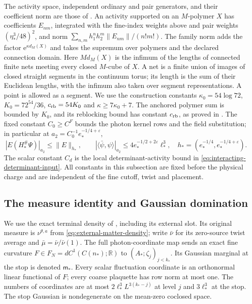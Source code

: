 \documentclass[11pt,letterpaper,reqno]{amsart}
\newcommand{\R}{\mathbb R}
\begin{document}
The activity space, independent ordinary and pair generators, and
their coefficient norm are those of \cite[\S2.2]{NormalizedContraction}.
An activity supported on an $M$-polymer $X$ has coefficients
$E_{nm}$, integrated with the fine-index weights above and pair
weights $(\eta_*^3/48)^2$, and norm
$\sum_{n,m}h_1^nh_2^m\|E_{nm}\|/(n!m!)$.
The family norm adds the factor $\mathrm e^{\kappa d_M(X)}$ and takes
the supremum over polymers and the declared connection domain.
Here $Md_M(X)$ is the infimum of the lengths of connected finite
nets meeting every closed $M$-cube of $X$. A net is a finite union
of images of closed straight segments in the continuum torus;
its length is the sum of their Euclidean lengths, with the infimum
also taken over segment representations. A point is allowed as a
segment. We use the construction constants
$\kappa_0=54\log72$, $K_0=72^{54}/36$,
$c_{\rm rb}=54K_0$ and $\kappa\ge7\kappa_0+7$.
The anchored polymer sum is bounded by $K_0$, and its reblocking
bound has constant $c_{\rm rb}$, as proved in
\cite[Appendix~B, (79)--(83)]{NormalizedContraction}.
The fixed constant $C_0\ge C^F$ bounds the photon kernel rows and
the field substitution; in particular at
$a_2=C_0^{-1}e_*^{-1/4+\varepsilon}$,
\[
 |E(H_*^\#\Psi)|_{a_2}\le\|E\|_{h_*},\qquad
 |\langle\bar\psi,\psi\rangle|_{a_2}
          \le4e_*^{-1/2+2\varepsilon}\ell_*^3,
 \quad h_*=(e_*^{-1/4},e_*^{-1/4+\varepsilon}).
\]
The scalar constant $C_d$ is the local determinant-activity bound
in \eqref{eq:interacting-determinant-input}.
All constants in this subsection are fixed before the physical charge
and are independent of the fine cutoff, twist and placement.

\subsection{The measure identity and Gaussian domination}
We use the exact terminal density of
\cite[Theorem~B]{TerminalPressure}, including its external slot.
Its original measure is $\nu^{\theta,a}$ from
\eqref{eq:external-matter-density}; write $\bar\nu$ for its
zero-source twist average and $\bar\mu=\bar\nu/\bar\nu(1)$.
The full photon-coordinate map sends an exact fine curvature
$F\in F_N=dC^1(C(n_*);\R)$ to $(A_*;\zeta_j)_{j<k_*}$.
Its Gaussian marginal at the stop is denoted $\mathsf m_*$.
Every scalar fluctuation coordinate is an orthonormal linear
functional of $F$; every coarse plaquette has row norm at most one.
The numbers of coordinates are at most
$2\ell_*^3L^{3(k_*-j)}$ at level $j$ and $3\ell_*^3$ at the stop.
The stop Gaussian is nondegenerate on the mean-zero coclosed space.
\end{document}
